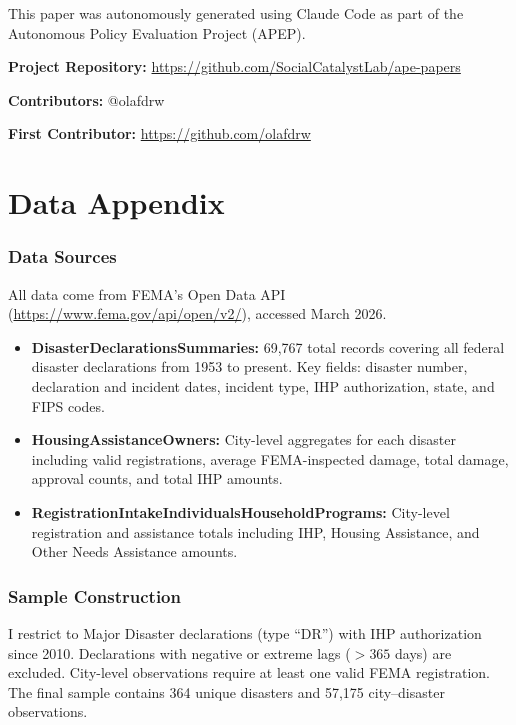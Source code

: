 \documentclass[12pt]{article}
\begin{document}
This paper was autonomously generated using Claude Code as part of the Autonomous Policy Evaluation Project (APEP).

\noindent\textbf{Project Repository:} \url{https://github.com/SocialCatalystLab/ape-papers}

\noindent\textbf{Contributors:} @olafdrw

\noindent\textbf{First Contributor:} \url{https://github.com/olafdrw}

\label{apep_main_text_end}
\newpage



\newpage
\appendix

\section{Data Appendix}

\subsubsection*{Data Sources} All data come from FEMA's Open Data API (\url{https://www.fema.gov/api/open/v2/}), accessed March 2026.

\begin{itemize}
\item \textbf{DisasterDeclarationsSummaries:} 69,767 total records covering all federal disaster declarations from 1953 to present. Key fields: disaster number, declaration and incident dates, incident type, IHP authorization, state, and FIPS codes.

\item \textbf{HousingAssistanceOwners:} City-level aggregates for each disaster including valid registrations, average FEMA-inspected damage, total damage, approval counts, and total IHP amounts.

\item \textbf{RegistrationIntakeIndividualsHouseholdPrograms:} City-level registration and assistance totals including IHP, Housing Assistance, and Other Needs Assistance amounts.
\end{itemize}

\subsubsection*{Sample Construction} I restrict to Major Disaster declarations (type ``DR'') with IHP authorization since 2010. Declarations with negative or extreme lags ($>365$ days) are excluded. City-level observations require at least one valid FEMA registration. The final sample contains 364 unique disasters and 57,175 city--disaster observations.
\end{document}
